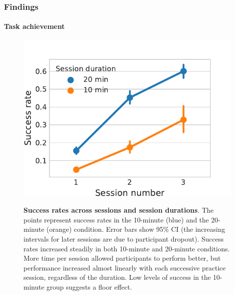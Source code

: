 \subsubsection{Findings}

\paragraph{Task achievement}

\begin{figure}[t]
    \centering
    {\includegraphics[width=.5\linewidth]{Figures/c5/success_rates.pdf}}
    \caption[short figure description]{\textbf{Success rates across sessions and session durations}. The points represent success rates in the 10-minute (blue) and the 20-minute (orange) condition. Error bars show 95\% CI (the increasing intervals for later sessions are due to participant dropout). Success rates increased steadily in both 10-minute and 20-minute conditions. More time per session allowed participants to perform better, but performance increased almost linearly with each successive practice session, regardless of the duration. Low levels of success in the 10-minute group suggests a floor effect.}\label{fig:5-success_rates}
\end{figure}

